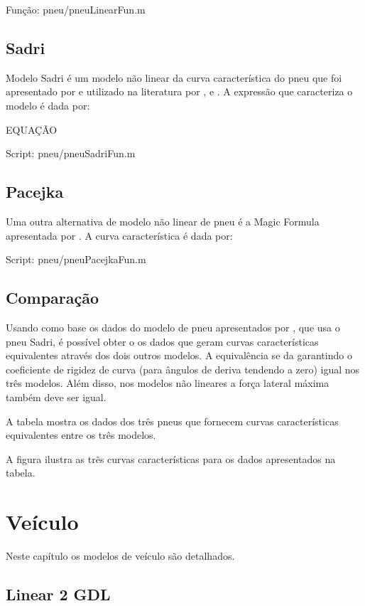 \documentclass[sublist]{fei}
\begin{document}
Função: pneu/pneuLinearFun.m

\section{Sadri}

Modelo Sadri é um modelo não linear da curva característica do pneu que foi apresentado por  e utilizado na literatura por ,  e . A expressão que caracteriza o modelo é dada por:

EQUAÇÃO

Script: pneu/pneuSadriFun.m

\section{Pacejka}

Uma outra alternativa de modelo não linear de pneu é a Magic Formula apresentada por . A curva característica é dada por:

Script: pneu/pneuPacejkaFun.m


\section{Comparação}

Usando como base os dados do modelo de pneu apresentados por , que usa o pneu Sadri, é possível obter o os dados que geram curvas características equivalentes através dos dois outros modelos. A equivalência se da garantindo o coeficiente de rigidez de curva (para ângulos de deriva tendendo a zero) igual nos três modelos. Além disso, nos modelos não lineares a força lateral máxima também deve ser igual.

A tabela  mostra os dados dos três pneus que fornecem curvas características equivalentes entre os três modelos.

A figura ilustra as trẽs curvas características para os dados apresentados na tabela.


\chapter{Veículo}

Neste capítulo os modelos de veículo são detalhados.

\section{Linear 2 GDL}
\end{document}
